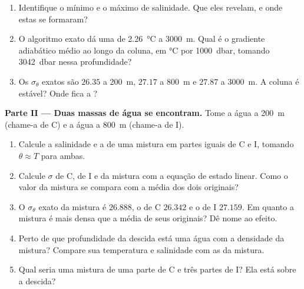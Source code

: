 \begin{problem}
\begin{enumerate}
  \item Identifique o mínimo e o máximo de salinidade. Que  eles revelam, e onde
        estas se formaram?
  \item O algoritmo exato dá uma  de \qty{2.26}{\celsius} a \qty{3000}{m}.
        Qual é o gradiente adiabático médio ao longo da coluna, em \si{\celsius} por
        \qty{1000}{dbar}, tomando \qty{3042}{dbar} nessa profundidade?
  \item Os $\sigma_\theta$ exatos são $26.35$ a \qty{200}{m}, $27.17$ a \qty{800}{m} e $27.87$ a
        \qty{3000}{m}. A coluna é estável? Onde fica a ?
\end{enumerate}

\medskip
\noindent\textbf{Parte II --- Duas massas de água se encontram.} Tome a água a
\qty{200}{m} (chame-a de C) e a água a \qty{800}{m} (chame-a de I).
\begin{enumerate}[resume]
  \item Calcule a salinidade e a  de uma mistura em partes iguais de C e I,
        tomando $\theta \approx T$ para ambas.
  \item Calcule $\sigma$ de C, de I e da mistura com a equação de estado linear. Como o valor da
        mistura se compara com a média dos dois originais?
  \item O $\sigma_\theta$ exato da mistura é $26.888$, o de C $26.342$ e o de I $27.159$. Em quanto
        a mistura é mais densa que a média de seus originais? Dê nome ao efeito.
  \item Perto de que profundidade da descida está uma água com a densidade da mistura? Compare sua
        temperatura e salinidade com as da mistura.
  \item Qual seria uma mistura de uma parte de C e três partes de I? Ela está sobre a descida?
\end{enumerate}


\end{problem}

